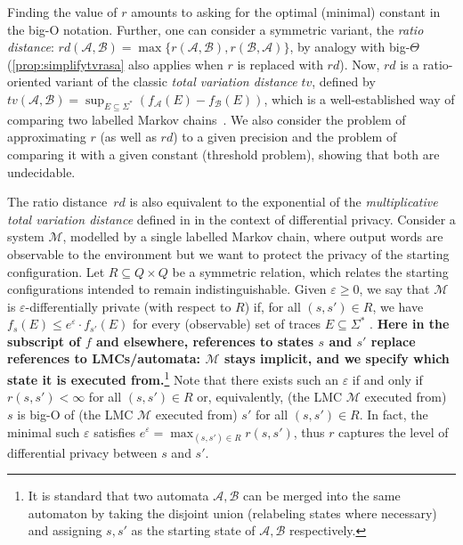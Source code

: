 \documentclass[10pt,a4paper]{amsart}
\numberwithin{equation}{section}
\theoremstyle{plain}
\theoremstyle{definition}
\theoremstyle{remark}
\newcommand\lmc{\mathcal{M}}
\newcommand\tvra{\mathit{r}}
\newcommand\tvrs{\mathit{rd}}
\newcommand\tvstandard{\mathit{tv}}
\begin{document}
Finding the value of $\tvra$ amounts to  asking for the optimal (minimal) constant in the big-O notation.
Further, one can consider a symmetric variant, the \emph{ratio distance}:
$\tvrs(\mathcal A, \mathcal B) = \max\{\tvra(\mathcal A, \mathcal B),\tvra(\mathcal B, \mathcal A)\}$,
by analogy with big-$\Theta$ (\cref{prop:simplifytvrasa} also applies when $\tvra$ is replaced with $\tvrs$).
Now, $\tvrs$ is a ratio-oriented variant of the classic \emph{total variation distance} $\tvstandard$, defined by $\tvstandard(\mathcal A, \mathcal B) = \sup_{E \subseteq \Sigma^*} (f_{\mathcal A}(E) - f_{\mathcal B}(E))$,
which is a well-established way of comparing two labelled Markov chains~\cite{chen2014total,kiefer2018computing}.
We also consider
the problem of approximating $\tvra$ (as well as $\tvrs$)
to a given precision and the problem of comparing it with a given constant (threshold problem),
showing that both are undecidable.

The ratio distance~$\tvrs$ is  also equivalent to  the exponential of the  \emph{multiplicative total variation distance}
defined in \cite{chatzikokolakis2014generalized,DBLP:journals/corr/abs-0809-4794} in the context of differential privacy.
Consider a system $\lmc$, modelled by a single labelled Markov chain, where output words are observable to the environment but we want to protect the privacy of the starting configuration.  Let $R\subseteq Q\times Q$ be a symmetric relation, which relates the starting configurations intended to remain indistinguishable. Given $\varepsilon\ge 0$, we say that $\lmc$ is $\varepsilon$-differentially private (with respect to $R$) if, for all $(s,s')\in R$, we have
$f_s(E) \leq e^{\varepsilon}\cdot f_{s'}(E)$
for every (observable) set of traces $E\subseteq \Sigma^*$ \cite{dwork2006calibrating,chistikov2019asymmetric}.
\textbf{Here in the subscript of $f$ and elsewhere,
references to states $s$ and $s'$ replace references to LMCs/automata:
$\mathcal M$ stays implicit, and we specify
which state it is executed from.}\footnote{It is standard that two automata $\mathcal{A},\mathcal{B}$ can be merged into the same automaton by taking the disjoint union (relabeling states where necessary) and assigning $s,s'$ as the starting state of $\mathcal{A},\mathcal{B}$ respectively.} 
Note that there exists such an $\varepsilon$ if and only if $\tvra(s,s')<\infty$ for all $(s,s')\in R$ or, equivalently,
(the LMC $\mathcal M$ executed from)  $s$ is big-O of
(the LMC $\mathcal M$ executed from)  $s'$ for all $(s,s')\in R$.
In fact, the minimal such $\varepsilon$ satisfies $e^\varepsilon = \max_{(s,s')\in R} \tvra(s,s')$, thus $\tvra$ captures the level of differential privacy between $s$ and $s'$.
\end{document}
